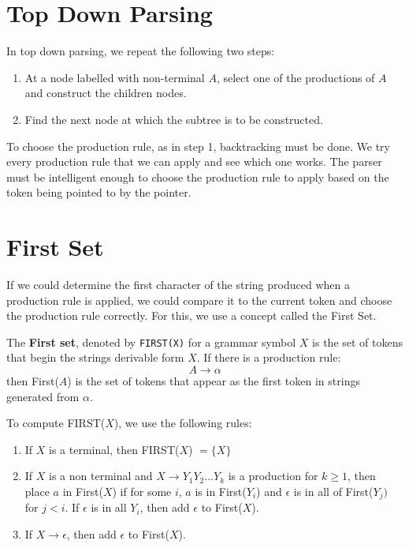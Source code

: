 \documentclass[12pt,letterpaper]{amsbook}
\theoremstyle{definition}
\begin{document}
\section{Top Down Parsing}

In top down parsing, we repeat the following two steps:

\begin{enumerate}
  \item At a node labelled with non-terminal $A$, select one of the productions of $A$ and construct the children nodes.
  \item Find the next node at which the subtree is to be constructed.
\end{enumerate}

To choose the production rule, as in step 1, backtracking must be done. We try every production rule that we can apply and see which one works. The parser must be intelligent enough to choose the production rule to apply based on the token being pointed to by the pointer.

\section{First Set}

If we could determine the first character of the string produced when a production rule is applied, we could compare it to the current token and choose the production rule correctly. For this, we use a concept called the First Set.

The \textbf{First set}, denoted by \texttt{FIRST(X)} for a grammar symbol $X$ is the set of tokens that begin the strings derivable form $X$. If there is a production rule:
\[A \rightarrow \alpha\]
then First($A$) is the set of tokens that appear as the first token in strings generated from $\alpha$.

To compute FIRST($X$), we use the following rules:

\begin{enumerate}
  \item If $X$ is a terminal, then FIRST($X$) $= \{X\}$
  \item If $X$ is a non terminal and $X \rightarrow Y_1Y_2...Y_k$ is a production for $k \geq 1$, then place $a$ in First($X$) if for some $i$, $a$ is in First($Y_i$) and $\epsilon$ is in all of First($Y_j)$ for $j < i$. If $\epsilon$ is in all $Y_i$, then add $\epsilon$ to First($X$).
  \item If $X \rightarrow \epsilon$, then add $\epsilon$ to First($X$).
\end{enumerate}
\end{document}
